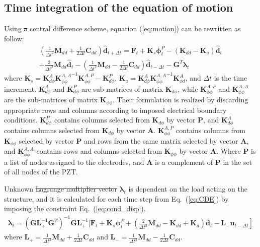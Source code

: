 \documentclass[materials,article,submit,moreauthors,pdftex]{Definitions/mdpi}
\providecommand{\DIFadd}[1]{{\protect\color{blue}{#1}}} %
\providecommand{\DIFdel}[1]{{\protect\color{red}\sout{#1}}}                      %
\providecommand{\DIFaddbegin}{} %
\providecommand{\DIFaddend}{} %
\providecommand{\DIFdelbegin}{} %
\providecommand{\DIFdelend}{} %
\begin{document}
\subsection{Time integration of the equation of motion}
\label{sec:time_integration}
Using \DIFdelbegin \DIFdel{a }\DIFdelend \DIFaddbegin \DIFadd{the }\DIFaddend central difference scheme, equation (\ref{eq:motion}) can be rewritten as follow:
\begin{eqnarray}
\left(\frac{1}{\Delta t^2}\textbf{M}_{dd}+\frac{1}{2\Delta t}\textbf{C}_{dd} \right)\widehat{\textbf{d}}_{t+\Delta t}=
\textbf{F}_t+\textbf{K}_s\boldsymbol{\phi}_t^P-\left( \textbf{K}_{dd}-\textbf{K}_a\right)\widehat{\textbf{d}}_t\nonumber\\
+\frac{2}{\Delta t^2}\textbf{M}_{dd}\widehat{\textbf{d}}_t-\left(\frac{1}{\Delta t^2}\textbf{M}_{dd}-\frac{1}{2\Delta t}\textbf{C}_{dd}\right)\widehat{\textbf{d}}_{t-\Delta t}-\textbf{G}^T\boldsymbol{\lambda}_t
\label{eq:CDE}
\end{eqnarray}
where  \(\textbf{K}_s=\textbf{K}_{d\phi}^A{\textbf{K}_{\phi \phi}^{A,A}}^{-1}\textbf{K}_{\phi \phi}^{A,P}-\textbf{K}_{d\phi}^P\), \(\textbf{K}_a=\textbf{K}_{d \phi}^A{\textbf{K}_{\phi \phi}^{A,A}}^{-1}\textbf{K}_{\phi d}^A\), and \(\Delta t\) is the time increment.
\(\textbf{K}_{d \phi}^A\) and \(\textbf{K}_{d\phi}^P\) are sub-matrices of matrix \(\textbf{K}_{d\phi}\), while \(\textbf{K}_{\phi \phi}^{A,P}\) and \(\textbf{K}_{\phi \phi}^{A,A}\) are the sub-matrices of matrix \(\textbf{K}_{\phi \phi}\).
Their formulation is realized by discarding appropriate rows and columns according to imposed electrical boundary conditions.
\(\textbf{K}_{d \phi}^P\) contains columns selected from \(\textbf{K}_{d\phi}\) by vector \textbf{P}, and \(\textbf{K}_{d\phi}^A\) contains columns selected from \(\textbf{K}_{d\phi}\) by vector \textbf{A}.
\(\textbf{K}_{\phi \phi}^{A,P}\) contains columns from \(\textbf{K}_{\phi \phi}\) selected by vector \textbf{P} and rows from the same matrix selected by vector \textbf{A}, and \(\textbf{K}_{\phi \phi}^{A,A}\) contains rows and columns selected from \(\textbf{K}_{\phi \phi}\) by vector \textbf{A}.
Where \textbf{P} is a list of nodes assigned to the electrodes, and \textbf{A} is a complement of \textbf{P} in the set of all nodes of the PZT.

Unknown \DIFdelbegin \DIFdel{Lagrange multiplier vector }\DIFdelend \DIFaddbegin \DIFadd{vector of Lagrange multipliers }\DIFaddend \(\boldsymbol{\lambda}_t\) is dependent on the load acting on the structure, and it is calculated for each time step from Eq.~(\ref{eq:CDE}) by imposing the constraint Eq.~(\ref{eq:cond_disp}).
\begin{eqnarray}
\boldsymbol{\lambda}_t = {\left(\textbf{G}\textbf{L}_+^{-1}\textbf{G}^T \right)}^{-1}\textbf{G}\textbf{L}_+^{-1} \Bigg[ \textbf{F}_t+\textbf{K}_s\boldsymbol{\phi}_t^P+\left.\left(\frac{2}{\Delta t^2}\textbf{M}_{dd}-\textbf{K}_{dd}+\textbf{K}_a\right)\textbf{d}_t -\textbf{L}_-\textbf{u}_{t-\Delta t} \right]
\end{eqnarray}
where \(\textbf{L}_+=\frac{1}{\Delta t^2}\textbf{M}_{dd}+\frac{1}{2\Delta t}\textbf{C}_{dd}\) and \(\textbf{L}_-=\frac{1}{\Delta t^2}\textbf{M}_{dd}-\frac{1}{2\Delta t}\textbf{C}_{dd}\).
\end{document}
